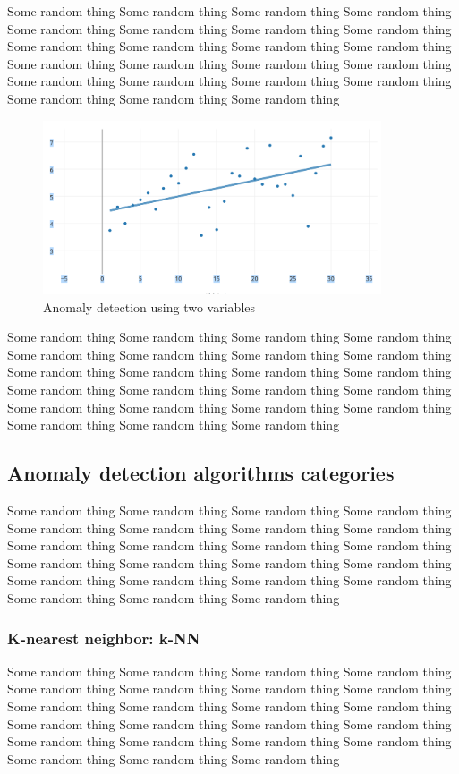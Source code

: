 Some random thing Some random thing Some random thing Some random thing Some random thing Some random thing Some random thing Some random thing Some random thing Some random thing Some random thing Some random thing Some random thing Some random thing Some random thing Some random thing Some random thing Some random thing Some random thing Some random thing Some random thing Some random thing Some random thing  
\begin{figure}[ht]
	\centering
	\includegraphics[width=10cm]{texfiles/images/2 variables.png}
	\caption{Anomaly detection using two variables \protect\cite{Generali53:online}}
	\label{fig:my_label}
\end{figure}
Some random thing Some random thing Some random thing Some random thing Some random thing Some random thing Some random thing Some random thing Some random thing Some random thing Some random thing Some random thing Some random thing Some random thing Some random thing Some random thing Some random thing Some random thing Some random thing Some random thing Some random thing Some random thing Some random thing  
\subsection{Anomaly detection algorithms categories}
Some random thing Some random thing Some random thing Some random thing Some random thing Some random thing Some random thing Some random thing Some random thing Some random thing Some random thing Some random thing Some random thing Some random thing Some random thing Some random thing Some random thing Some random thing Some random thing Some random thing Some random thing Some random thing Some random thing   \newline
\subsubsection{K-nearest neighbor: k-NN}

Some random thing Some random thing Some random thing Some random thing Some random thing Some random thing Some random thing Some random thing Some random thing Some random thing Some random thing Some random thing Some random thing Some random thing Some random thing Some random thing Some random thing Some random thing Some random thing Some random thing Some random thing Some random thing Some random thing  \newline


